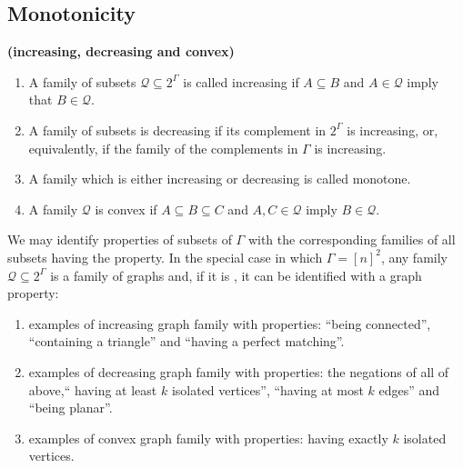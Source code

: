 \documentclass{article}
\newcommand{\bfs}[1]{\textbf{({#1}) }}
\begin{document}
\subsection{Monotonicity}
\begin{defa}{\bfs{increasing, decreasing and convex}}
\begin{enumerate}
    \item A family of subsets $\mathcal{Q} \subseteq 2^{\Gamma}$ is called increasing if $A \subseteq B$ and $A \in \mathcal{Q}$ imply that $B \in \mathcal{Q}$.
    \item A family of subsets is decreasing if its complement in $2^{\Gamma}$ is increasing, or, equivalently, if the family of the complements in $\Gamma$ is increasing. 
    \item A family which is either increasing or decreasing is called monotone.
    \item  A family $\mathcal{Q}$ is convex if $A \subseteq B \subseteq C$ and $A, C \in \mathcal{Q}$ imply $B \in \mathcal{Q} .$
\end{enumerate}
\end{defa}
\begin{rema}
We may identify properties of subsets of $\Gamma$ with the corresponding families of all subsets having the property. In the special case in which $\Gamma=[n]^{2}$, any family $\mathcal{Q} \subseteq 2^{\Gamma}$ is a family of graphs and, if it is , it can be identified with a graph property: 
\begin{enumerate}
    \item examples of increasing graph family with properties: ``being connected'', ``containing a triangle'' and   ``having a perfect matching''.
     \item examples of decreasing graph family with properties: the negations of all of above,`` having at least $k$ isolated vertices'', ``having at most $k$ edges'' and ``being planar''.
     \item  examples of convex graph family with properties: having exactly $k$ isolated vertices.
\end{enumerate}
\end{rema}
\end{document}
